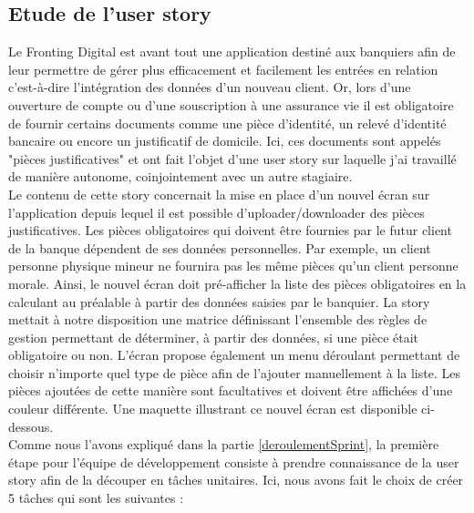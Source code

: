 \subsection{Etude de l'user story}

	Le Fronting Digital est avant tout une application destiné aux banquiers afin de leur permettre de gérer plus efficacement et facilement les entrées en relation c'est-à-dire l'intégration des données d'un nouveau client. Or, lors d'une ouverture de compte ou d'une souscription à une assurance vie il est obligatoire de fournir certains documents comme une pièce d'identité, un relevé d'identité bancaire ou encore un justificatif de domicile. Ici, ces documents sont appelés "pièces justificatives" et ont fait l'objet d'une user story sur laquelle j'ai travaillé de manière autonome, coinjointement avec un autre stagiaire. \\
	
	Le contenu de cette story concernait la mise en place d'un nouvel écran sur l'application depuis lequel il est possible d'uploader/downloader des pièces justificatives. Les pièces obligatoires qui doivent être fournies par le futur client de la banque dépendent de ses données personnelles. Par exemple, un client personne physique mineur ne fournira pas les même pièces qu'un client personne morale. Ainsi, le nouvel écran doit pré-afficher la liste des pièces obligatoires en la calculant au préalable à partir des données saisies par le banquier. La story mettait à notre disposition une matrice définissant l'ensemble des règles de gestion permettant de déterminer, à partir des données, si une pièce était obligatoire ou non. L'écran propose également un menu déroulant permettant de choisir n'importe quel type de pièce afin de l'ajouter manuellement à la liste. Les pièces ajoutées de cette manière sont facultatives et doivent être affichées d'une couleur différente. Une maquette illustrant ce nouvel écran est disponible ci-dessous. \\

	Comme nous l'avons expliqué dans la partie \ref{deroulementSprint}, la première étape pour l'équipe de développement consiste à prendre connaissance de la user story afin de la découper en tâches unitaires. Ici, nous avons fait le choix de créer 5 tâches qui sont les suivantes :
	
